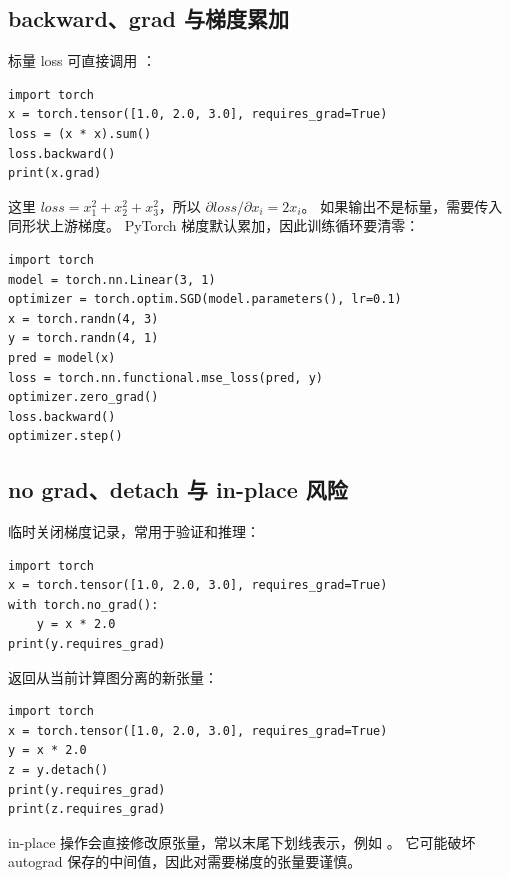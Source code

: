 \subsection{backward、grad 与梯度累加}
标量 loss 可直接调用 ：
\begin{lstlisting}
import torch
x = torch.tensor([1.0, 2.0, 3.0], requires_grad=True)
loss = (x * x).sum()
loss.backward()
print(x.grad)
\end{lstlisting}
这里 $loss=x_1^2+x_2^2+x_3^2$，所以 $\partial loss/\partial x_i=2x_i$。
如果输出不是标量，需要传入同形状上游梯度。
PyTorch 梯度默认累加，因此训练循环要清零：
\begin{lstlisting}
import torch
model = torch.nn.Linear(3, 1)
optimizer = torch.optim.SGD(model.parameters(), lr=0.1)
x = torch.randn(4, 3)
y = torch.randn(4, 1)
pred = model(x)
loss = torch.nn.functional.mse_loss(pred, y)
optimizer.zero_grad()
loss.backward()
optimizer.step()
\end{lstlisting}

\subsection{no grad、detach 与 in-place 风险}
 临时关闭梯度记录，常用于验证和推理：
\begin{lstlisting}
import torch
x = torch.tensor([1.0, 2.0, 3.0], requires_grad=True)
with torch.no_grad():
    y = x * 2.0
print(y.requires_grad)
\end{lstlisting}
 返回从当前计算图分离的新张量：
\begin{lstlisting}
import torch
x = torch.tensor([1.0, 2.0, 3.0], requires_grad=True)
y = x * 2.0
z = y.detach()
print(y.requires_grad)
print(z.requires_grad)
\end{lstlisting}
in-place 操作会直接修改原张量，常以末尾下划线表示，例如 。
它可能破坏 autograd 保存的中间值，因此对需要梯度的张量要谨慎。

